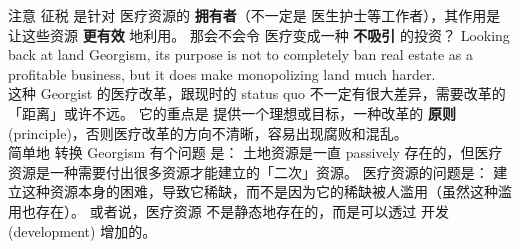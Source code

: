 \begin{preview}
\begin{minipage}{\textwidth}
注意 征税 是针对 医疗资源的 \textbf{拥有者}（不一定是 医生护士等工作者），其作用是 让这些资源 \textbf{更有效} 地利用。 那会不会令 医疗变成一种 \textbf{不吸引} 的投资？ Looking back at land Georgism, its purpose is not to completely ban real estate as a profitable business, but it does make monopolizing land much harder.\\

这种 Georgist 的医疗改革，跟现时的 status quo 不一定有很大差异，需要改革的「距离」或许不远。 它的重点是 提供一个理想或目标，一种改革的 \textbf{原则} (principle)，否则医疗改革的方向不清晰，容易出现腐败和混乱。  \\

简单地 转换 Georgism 有个问题 是： 土地资源是一直 passively 存在的，但医疗资源是一种需要付出很多资源才能建立的「二次」资源。 医疗资源的问题是： 建立这种资源本身的困难，导致它稀缺，而不是因为它的稀缺被人滥用（虽然这种滥用也存在）。 或者说，医疗资源 不是静态地存在的，而是可以透过 开发 (development) 增加的。 \\



\end{minipage}
\end{preview}

